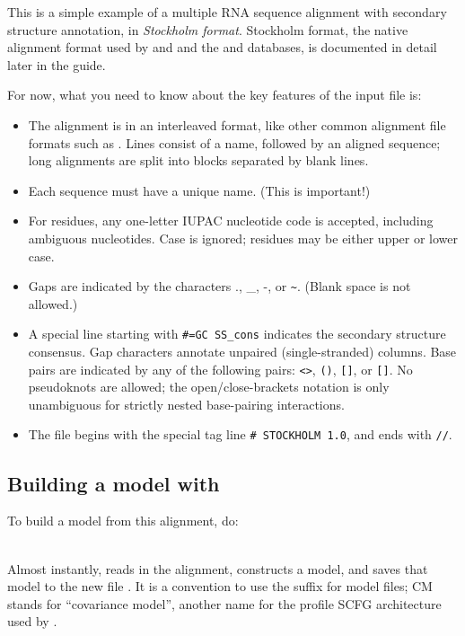 This is a simple example of a multiple RNA sequence alignment with
secondary structure annotation, in \emph{Stockholm format}. Stockholm
format, the native alignment format used by  and
 and the  and 
databases, is documented in detail later in the guide.

For now, what you need to know about the key features of the input file is:
\begin{itemize}
\item The alignment is in an interleaved format, like other
common alignment file formats such as .
Lines consist of a name, followed by an aligned sequence;
long alignments are split into blocks separated by blank lines.
\item Each sequence must have a unique name. (This is important!)
\item For residues, any one-letter IUPAC nucleotide code is accepted,
      including ambiguous nucleotides. Case is ignored; residues
      may be either upper or lower case.
\item Gaps are indicated by the characters ., \_, -, or \verb+~+.
      (Blank space is not allowed.)
\item A special line starting with {\small\verb+#=GC SS_cons+} indicates
      the secondary structure consensus. Gap characters annotate
      unpaired (single-stranded) columns. Base pairs are indicated
      by any of the following pairs: \verb+<>+, \verb+()+, \verb+[]+,
      or \verb+[]+. No pseudoknots are allowed; the
      open/close-brackets notation is only unambiguous for strictly
      nested base-pairing interactions.
\item The file begins with the special tag line
      {\small\verb+# STOCKHOLM 1.0+}, and ends with {\small\verb+//+}.
\end{itemize}

\subsection{Building a model with }

To build a model from this alignment, do:

\\

Almost instantly,  reads in the alignment, constructs a
model, and saves that model to the new file . It is a
convention to use the  suffix for model files; CM stands for
``covariance model'', another name for the profile SCFG architecture
used by  \cite{Eddy94}.

